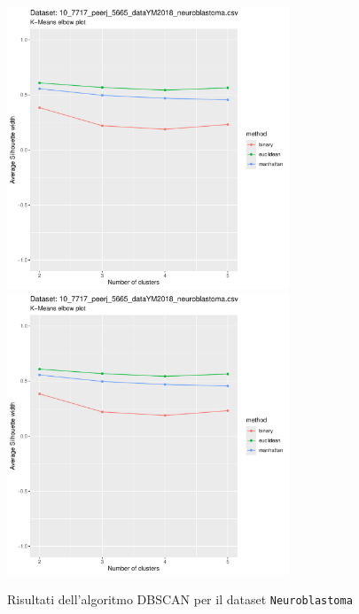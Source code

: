 \documentclass[a4paper, 12pt]{report}
\begin{document}
			\begin{figure}[H]
				\centering
				\includegraphics[width = 0.75\textwidth, height = 0.45\textheight, page = 5]{
					results/results_Neuroblastoma.csv.pdf
				}
				\includegraphics[width = 0.75\textwidth, height = 0.45\textheight, page = 6]{
					results/results_Neuroblastoma.csv.pdf
				}
				\caption{Risultati dell'algoritmo DBSCAN per il dataset
				\texttt{Neuroblastoma}}
				\label{fig:dbscan3}
			\end{figure}
\end{document}
